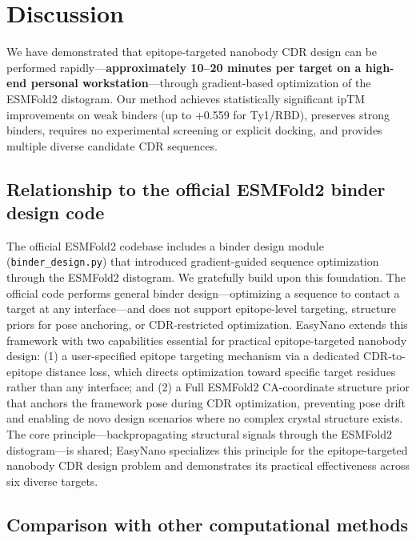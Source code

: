 \documentclass[11pt,a4paper]{article}
\begin{document}
\section{Discussion}

We have demonstrated that epitope-targeted nanobody CDR design can be performed rapidly---\textbf{approximately 10--20 minutes per target on a high-end personal workstation}---through gradient-based optimization of the ESMFold2 distogram. Our method achieves statistically significant ipTM improvements on weak binders (up to +\num{0.559} for Ty1/RBD), preserves strong binders, requires no experimental screening or explicit docking, and provides multiple diverse candidate CDR sequences.

\subsection{Relationship to the official ESMFold2 binder design code}

The official ESMFold2 codebase includes a binder design module (\texttt{binder\_design.py})\cite{lin2023} that introduced gradient-guided sequence optimization through the ESMFold2 distogram. We gratefully build upon this foundation. The official code performs general binder design---optimizing a sequence to contact a target at any interface---and does not support epitope-level targeting, structure priors for pose anchoring, or CDR-restricted optimization. EasyNano extends this framework with two capabilities essential for practical epitope-targeted nanobody design: (1) a user-specified epitope targeting mechanism via a dedicated CDR-to-epitope distance loss, which directs optimization toward specific target residues rather than any interface; and (2) a Full ESMFold2 CA-coordinate structure prior that anchors the framework pose during CDR optimization, preventing pose drift and enabling de novo design scenarios where no complex crystal structure exists. The core principle---backpropagating structural signals through the ESMFold2 distogram---is shared; EasyNano specializes this principle for the epitope-targeted nanobody CDR design problem and demonstrates its practical effectiveness across six diverse targets.

\subsection{Comparison with other computational methods}
\end{document}
